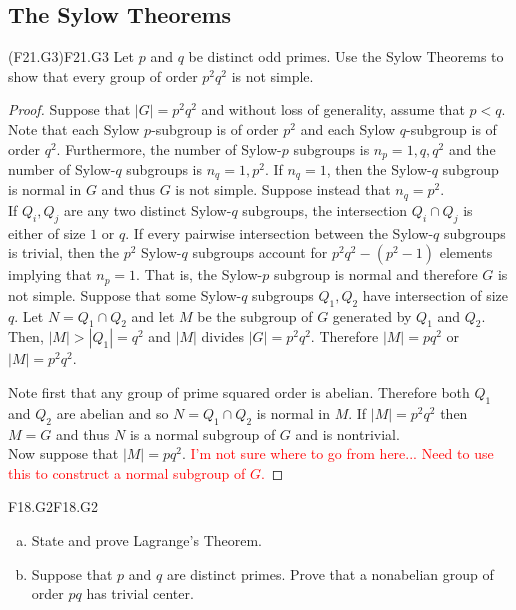 \documentclass[../../AlgebraQualSolutions.tex]{subfiles}
\begin{document}
\subsection{The Sylow Theorems}

	\begin{prob}{(F21.G3)}{F21.G3}
	Let $p$ and $q$ be distinct odd primes. Use the Sylow Theorems to show that every group of order $p^2q^2$ is not simple.
	\end{prob}	
	
	\begin{proof}
	Suppose that $|G| = p^2q^2$ and without loss of generality, assume that $p < q$. Note that each Sylow $p$-subgroup is of order $p^2$ and each Sylow $q$-subgroup is of order $q^2$. Furthermore, the number of Sylow-$p$ subgroups is $n_p = 1, q, q^2$ and the number of Sylow-$q$ subgroups is $n_q = 1, p^2$. If $n_q = 1$, then the Sylow-$q$ subgroup is normal in $G$ and thus $G$ is not simple. Suppose instead that $n_q = p^2$.\\
	
	If $Q_i, Q_j$ are any two distinct Sylow-$q$ subgroups, the intersection $Q_i \cap Q_j$ is either of size $1$ or $q$. If every pairwise intersection between the Sylow-$q$ subgroups is trivial, then the $p^2$ Sylow-$q$ subgroups account for $p^2q^2 - (p^2 -1)$ elements implying that $n_p = 1$. That is, the Sylow-$p$ subgroup is normal and therefore $G$ is not simple. Suppose that some Sylow-$q$ subgroups $Q_1, Q_2$ have intersection of size $q$. Let $N = Q_1 \cap Q_2$ and let $M$ be the subgroup of $G$ generated by $Q_1$ and $Q_2$. Then, $|M| > |Q_1| = q^2$ and $|M|$ divides $|G| = p^2q^2$. Therefore $|M| = pq^2$ or $|M| = p^2 q^2$. 
	
	Note first that any group of prime squared order is abelian. Therefore both $Q_1$ and $Q_2$ are abelian and so $N = Q_1 \cap Q_2$ is normal in $M$. If $|M| = p^2q^2$ then $M=G$ and thus $N$ is a normal subgroup of $G$ and is nontrivial.\\
	
	Now suppose that $|M| = pq^2$. \textcolor{red}{I'm not sure where to go from here... Need to use this to construct a normal subgroup of $G$.}
	\end{proof}
	\begin{prob}{F18.G2}{F18.G2}
		\begin{enumerate}[(a)]
			\item State and prove Lagrange's Theorem.
			\item Suppose that $p$ and $q$ are distinct primes. Prove that a nonabelian group of order $pq$ has trivial center.
		\end{enumerate}
	\end{prob}
\end{document}
